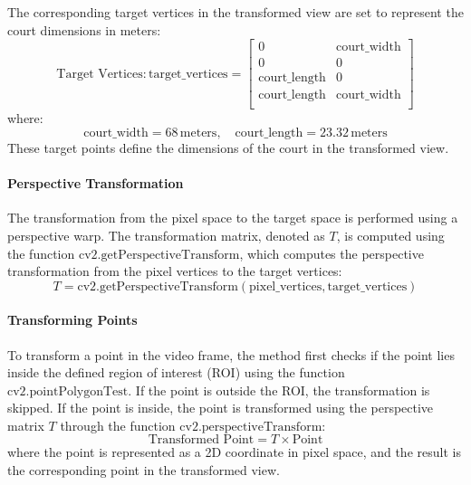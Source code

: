 The corresponding target vertices in the transformed view are set to represent the court dimensions in meters:
\begin{equation}
    \text{Target Vertices:} \, \text{target\_vertices} = 
    \left[\begin{matrix} 
    0 & \text{court\_width} \\
    0 & 0 \\
    \text{court\_length} & 0 \\
    \text{court\_length} & \text{court\_width} \\
    \end{matrix}\right]
\end{equation}
where:
\[
    \text{court\_width} = 68 \, \text{meters}, \quad \text{court\_length} = 23.32 \, \text{meters}
\]
These target points define the dimensions of the court in the transformed view.

\paragraph{Perspective Transformation}
The transformation from the pixel space to the target space is performed using a perspective warp. The transformation matrix, denoted as \( T \), is computed using the function \( \text{cv2.getPerspectiveTransform} \), which computes the perspective transformation from the pixel vertices to the target vertices:
\begin{equation}
    T = \text{cv2.getPerspectiveTransform}(\text{pixel\_vertices}, \text{target\_vertices})
\end{equation}

\paragraph{Transforming Points}
To transform a point in the video frame, the method first checks if the point lies inside the defined region of interest (ROI) using the function \( \text{cv2.pointPolygonTest} \). If the point is outside the ROI, the transformation is skipped. If the point is inside, the point is transformed using the perspective matrix \( T \) through the function \( \text{cv2.perspectiveTransform} \):
\begin{equation}
    \text{Transformed Point} = T \times \text{Point}
\end{equation}
where the point is represented as a 2D coordinate in pixel space, and the result is the corresponding point in the transformed view.

